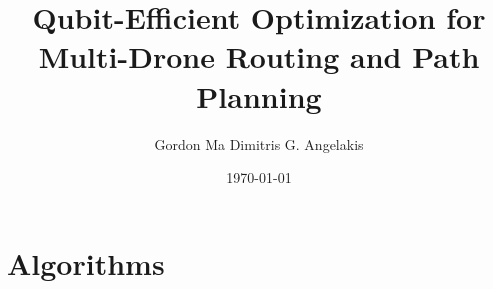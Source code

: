\documentclass[11pt]{article}      %
\title{Qubit-Efficient Optimization  for Multi-Drone Routing and Path Planning
}
\author{%
  Gordon Ma\quad
  Dimitris G. Angelakis \footnotemark[1]
}
\date{\today}
\begin{document}
\maketitle
%   






\newpage
% 

\newpage



\newpage
\appendix
\section{Algorithms}



\end{document}
